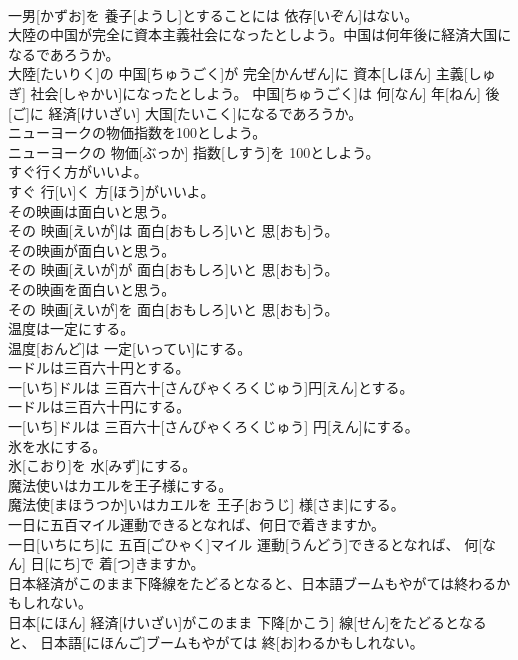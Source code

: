 \documentclass[8pt]{extreport}
\begin{document}
\begin{CJK}{UTF8}{min}
\\	一男[かずお]を 養子[ようし]とすることには 依存[いぞん]はない。
\\	大陸の中国が完全に資本主義社会になったとしよう。中国は何年後に経済大国になるであろうか。	
\\	大陸[たいりく]の 中国[ちゅうごく]が 完全[かんぜん]に 資本[しほん] 主義[しゅぎ] 社会[しゃかい]になったとしよう。 中国[ちゅうごく]は 何[なん] 年[ねん] 後[ご]に 経済[けいざい] 大国[たいこく]になるであろうか。
\\	ニューヨークの物価指数を100としよう。	
\\	ニューヨークの 物価[ぶっか] 指数[しすう]を 100としよう。
\\	すぐ行く方がいいよ。	
\\	すぐ 行[い]く 方[ほう]がいいよ。
\\	その映画は面白いと思う。	
\\	その 映画[えいが]は 面白[おもしろ]いと 思[おも]う。
\\	その映画が面白いと思う。	
\\	その 映画[えいが]が 面白[おもしろ]いと 思[おも]う。
\\	その映画を面白いと思う。	
\\	その 映画[えいが]を 面白[おもしろ]いと 思[おも]う。
\\	温度は一定にする。	
\\	温度[おんど]は 一定[いってい]にする。
\\	一ドルは三百六十円とする。	
\\	一[いち]ドルは 三百六十[さんびゃくろくじゅう]円[えん]とする。
\\	一ドルは三百六十円にする。	
\\	一[いち]ドルは 三百六十[さんびゃくろくじゅう] 円[えん]にする。
\\	氷を水にする。	
\\	氷[こおり]を 水[みず]にする。
\\	魔法使いはカエルを王子様にする。	
\\	魔法使[まほうつか]いはカエルを 王子[おうじ] 様[さま]にする。
\\	一日に五百マイル運動できるとなれば、何日で着きますか。	
\\	一日[いちにち]に 五百[ごひゃく]マイル 運動[うんどう]できるとなれば、 何[なん] 日[にち]で 着[つ]きますか。
\\	日本経済がこのまま下降線をたどるとなると、日本語ブームもやがては終わるかもしれない。	
\\	日本[にほん] 経済[けいざい]がこのまま 下降[かこう] 線[せん]をたどるとなると、 日本語[にほんご]ブームもやがては 終[お]わるかもしれない。

\end{CJK}
\end{document}
